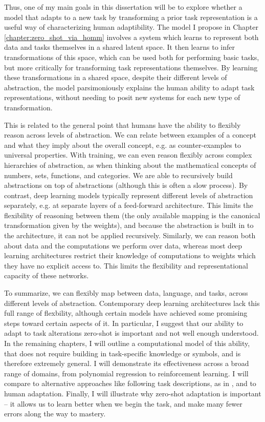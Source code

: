 Thus, one of my main goals in this dissertation will be to explore whether a model that adapts to a new task by transforming a prior task representation is a useful way of characterizing human adaptibility. The model I propose in Chapter \ref{chapter:zero_shot_via_homm} involves a system which learns to represent both data and tasks themselves in a shared latent space. It then learns to infer transformations of this space, which can be used both for performing basic tasks, but more critically for transforming task representations themselves. By learning these transformations in a shared space, despite their different levels of abstraction, the model parsimoniously explains the human ability to adapt task representations, without needing to posit new systems for each new type of transformation. \par
This is related to the general point that humans have the ability to flexibly reason across levels of abstraction. We can relate between examples of a concept and what they imply about the overall concept, e.g. as counter-examples to universal properties. With training, we can even reason flexibly across complex hierarchies of abstraction, as when thinking about the mathematical concepts of numbers, sets, functions, and categories. We are able to recursively build abstractions on top of abstractions (although this is often a slow process). By contrast, deep learning models typically represent different levels of abstraction separately, e.g. at separate layers of a feed-forward architecture. This limits the flexibility of reasoning between them (the only available mapping is the canonical transformation given by the weights), and because the abstraction is built in to the architecture, it can not be applied recursively. Similarly, we can reason both about data and the computations we perform over data, whereas most deep learning architectures restrict their knowledge of computations to weights which they have no explicit access to. This limits the flexibility and representational capacity of these networks. \par 
To summarize, we can flexibly map between data, language, and tasks, across different levels of abstraction. Contemporary deep learning architectures lack this full range of flexbility, although certain models have achieved some promising steps toward certain aspects of it. In particular, I suggest that our ability to adapt to task alterations zero-shot is important and not well enough understood. In the remaining chapters, I will outline a computational model of this ability, that does not require building in task-specific knowledge or symbols, and is therefore extremely general. I will demonstrate its effectiveness across a broad range of domains, from polynomial regression to reinforcement learning. I will compare to alternative approaches like following task descriptions, as in \citet{Hill2019a}, and to human adaptation. Finally, I will illustrate why zero-shot adaptation is important -- it allows us to learn better when we begin the task, and make many fewer errors along the way to mastery. \par 


